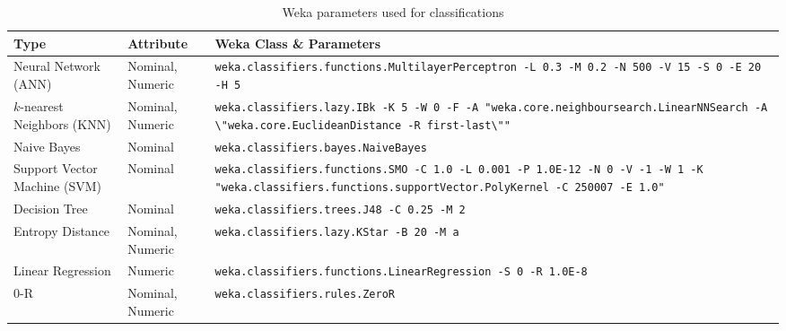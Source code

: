 \documentclass[../thesis/thesis.tex]{subfiles}
\begin{document}
\begin{table}
\centering
\begin{tabular}{|p{40mm}|p{20mm}|p{70mm}|}
\hline
\textbf{Type} & \textbf{Attribute} & \textbf{Weka Class} \& \textbf{Parameters} \\ \hline

{Neural Network \newline (ANN)} & {Nominal, \newline Numeric} & \texttt{weka.classifiers.functions\newline.MultilayerPerceptron \newline -L 0.3 -M 0.2 -N 500 -V 15 \newline -S 0 -E 20 -H 5} \\ \hline

{$k$-nearest Neighbors \newline (KNN)} & Nominal, \newline Numeric & \texttt{weka.classifiers.lazy.IBk \newline -K 5 -W 0 -F \newline -A "weka.core.neighboursearch\newline.LinearNNSearch -A \textbackslash"weka.core\newline.EuclideanDistance \newline -R first-last\textbackslash""} \\ \hline

Naive Bayes & Nominal & \texttt{weka.classifiers.bayes.NaiveBayes} \\ \hline

{Support Vector \newline Machine (SVM)} & Nominal & \texttt{weka.classifiers.functions.SMO \newline -C 1.0 -L 0.001 -P 1.0E-12 \newline -N 0 -V -1 -W 1 \newline -K "weka.classifiers.functions\newline.supportVector.PolyKernel \newline-C 250007 -E 1.0"} \\ \hline

Decision Tree & Nominal & \texttt{weka.classifiers.trees.J48 \newline -C 0.25 -M 2} \\ \hline

Entropy Distance & Nominal, \newline Numeric & \texttt{weka.classifiers.lazy.KStar \newline -B 20 -M a} \\ \hline %

Linear Regression & Numeric & \texttt{weka.classifiers.functions\newline.LinearRegression \newline -S 0 -R 1.0E-8} \\ \hline

0-R & Nominal, \newline Numeric & \texttt{weka.classifiers.rules.ZeroR} \\ \hline
\end{tabular}
\caption{Weka parameters used for classifications}
\label{tab:methods:params}
\end{table}
\end{document}
